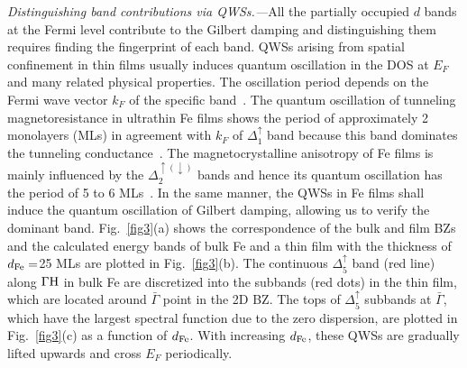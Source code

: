 \documentclass[prl,aps,twocolumn,showpacs,citeautoscript,reprint,superscriptaddress]{revtex4-1}
\begin{document}
{\it\color{red}Distinguishing band contributions via QWSs.---}All the partially occupied $d$ bands at the Fermi level contribute to the Gilbert damping and distinguishing them requires finding the fingerprint of each band. QWSs arising from spatial confinement in thin films usually induces quantum oscillation in the DOS at $E_F$ and many related physical properties. The oscillation period depends on the Fermi wave vector $k_F$ of the specific band~\cite{Smith:PRB94}. The quantum oscillation of tunneling magnetoresistance in ultrathin Fe films shows the period of approximately 2 monolayers (MLs) in agreement with $k_F$ of $\Delta_1^\uparrow$ band because this band dominates the tunneling conductance~\cite{Lu:PRL05,Nozaki:PRL06,Niizeki:PRL08,Tao:PRL15}. The magnetocrystalline anisotropy of Fe films is mainly influenced by the $\Delta_2^{\uparrow(\downarrow)}$ bands and hence its quantum oscillation has the period of 5 to 6 MLs~\cite{Wu:PRL05,Li:PRL09}. In the same manner, the QWSs in Fe films shall induce the quantum oscillation of Gilbert damping, allowing us to verify the dominant band. Fig.~\ref{fig3}(a) shows the correspondence of the bulk and film BZs and the calculated energy bands of bulk Fe and a thin film with the thickness of $d_{\rm Fe}=$25 MLs are plotted in Fig.~\ref{fig3}(b). The continuous $\Delta_5^{\uparrow}$ band (red line) along $\Gamma\rm H$ in bulk Fe are discretized into the subbands (red dots) in the thin film, which are located around $\bar{\Gamma}$ point in the 2D BZ. The tops of $\Delta_5^{\uparrow}$ subbands at $\bar{\Gamma}$, which have the largest spectral function due to the zero dispersion, are plotted in Fig.~\ref{fig3}(c) as a function of $d_{\rm Fe}$. With increasing $d_{\rm Fe}$, these QWSs are gradually lifted upwards and cross $E_F$ periodically.
\end{document}
